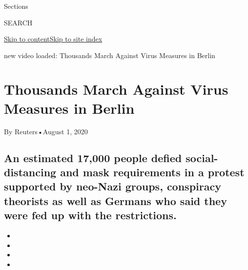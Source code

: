 Sections

SEARCH

\protect\hyperlink{site-content}{Skip to
content}\protect\hyperlink{site-index}{Skip to site index}

new video loaded: Thousands March Against Virus Measures in Berlin

\hypertarget{thousands-march-against-virus-measures-in-berlin}{%
\section{Thousands March Against Virus Measures in
Berlin}\label{thousands-march-against-virus-measures-in-berlin}}

By Reuters•August 1, 2020

\hypertarget{an-estimated-17000-people-defied-social-distancing-and-mask-requirements-in-a-protest-supported-by-neo-nazi-groups-conspiracy-theorists-as-well-as-germans-who-said-they-were-fed-up-with-the-restrictions}{%
\subsection{An estimated 17,000 people defied social-distancing and mask
requirements in a protest supported by neo-Nazi groups, conspiracy
theorists as well as Germans who said they were fed up with the
restrictions.}\label{an-estimated-17000-people-defied-social-distancing-and-mask-requirements-in-a-protest-supported-by-neo-nazi-groups-conspiracy-theorists-as-well-as-germans-who-said-they-were-fed-up-with-the-restrictions}}

\begin{itemize}
\item
\item
\item
\item
\end{itemize}

